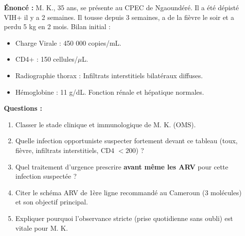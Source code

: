 \documentclass[11pt]{article}
\begin{document}
\begin{exercice}
\textbf{Énoncé :} M. K., 35 ans, se présente au CPEC de Ngaoundéré. Il a été dépisté VIH+ il y a 2 semaines. Il tousse depuis 3 semaines, a de la fièvre le soir et a perdu 5 kg en 2 mois. Bilan initial :
\begin{itemize}
    \item Charge Virale : 450 000 copies/mL.
    \item CD4+ : 150 cellules/$\mu$L.
    \item Radiographie thorax : Infiltrats interstitiels bilatéraux diffuses.
    \item Hémoglobine : 11 g/dL. Fonction rénale et hépatique normales.
\end{itemize}
\textbf{Questions :}
\begin{enumerate}
    \item Classer le stade clinique et immunologique de M. K. (OMS).
    \item Quelle infection opportuniste suspecter fortement devant ce tableau (toux, fièvre, infiltrats interstitiels, CD4 $< 200$) ?
    \item Quel traitement d'urgence prescrire \textbf{avant même les ARV} pour cette infection suspectée ?
    \item Citer le schéma ARV de 1ère ligne recommandé au Cameroun (3 molécules) et son objectif principal.
    \item Expliquer pourquoi l'observance stricte (prise quotidienne sans oubli) est vitale pour M. K.
\end{enumerate}
\end{exercice}
\end{document}

